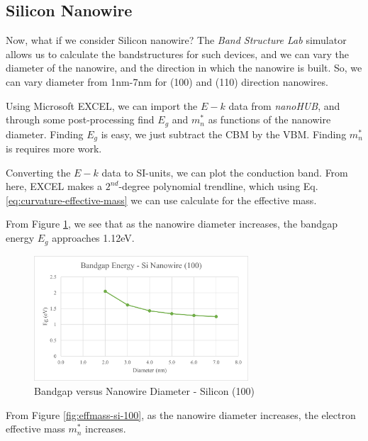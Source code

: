 \documentclass{IEEEtran}
\begin{document}
\subsection{Silicon Nanowire}


Now, what if we consider Silicon nanowire? The \textit{Band Structure Lab} simulator allows us to calculate the bandstructures for such devices, and we can vary the diameter of the nanowire, and the direction in which the nanowire is built. So, we can vary diameter from 1nm-7nm for (100) and (110) direction nanowires.

Using Microsoft EXCEL, we can import the \(E-k\) data from \textit{nanoHUB}, and through some post-processing find \(E_g\) and \(m_n^*\) as functions of the nanowire diameter. Finding \(E_g\) is easy, we just subtract the CBM by the VBM. Finding \(m_n^*\) is requires more work.

Converting the \(E-k\) data to SI-units, we can plot the conduction band. From here, EXCEL makes a \(2^{nd}\)-degree polynomial trendline, which using Eq. \ref{eq:curvature-effective-mass} we can use calculate for the effective mass.

From Figure \ref{fig:bandgap-si-100}, we see that as the nanowire diameter increases, the bandgap energy \(E_g\) approaches 1.12eV.

\begin{figure}[!ht] 
    \centering
    \includegraphics*[width = 8cm]{bandgap-si-100.png}
    \caption{Bandgap versus Nanowire Diameter - Silicon (100)}
    \label{fig:bandgap-si-100}
\end{figure}    

From Figure \ref{fig:effmass-si-100}, as the nanowire diameter increases, the electron effective mass \(m_n^*\) increases. 
\end{document}
